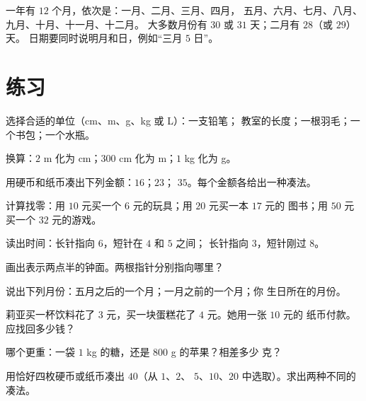 \begin{example}[日历]\label{ex:g2:measure:calendar}
一年有 $12$ 个月，依次是：一月、二月、三月、四月，
五月、六月、七月、八月、九月、十月、十一月、十二月。
大多数月份有 $30$ 或 $31$ 天；二月有 $28$（或 $29$）天。
日期要同时说明月和日，例如“三月 $5$ 日”。
\end{example}

\section{练习}

\begin{exercise}[$\star$]\label{exo:g2:measure:1}
选择合适的单位（cm、m、g、kg 或 L）：一支铅笔；
教室的长度；一根羽毛；一个书包；一个水瓶。
\end{exercise}

\begin{exercise}[$\star$]\label{exo:g2:measure:2}
换算：$2$ m 化为 cm；$300$ cm 化为 m；$1$ kg 化为 g。
\end{exercise}

\begin{exercise}[$\star$]\label{exo:g2:measure:3}
用硬币和纸币凑出下列金额：$16$；\quad $23$；\quad
$35$。每个金额各给出一种凑法。
\end{exercise}

\begin{exercise}[$\star$]\label{exo:g2:measure:4}
计算找零：用 $10$ 元买一个 $6$ 元的玩具；用 $20$ 元买一本 $17$ 元的
图书；用 $50$ 元买一个 $32$ 元的游戏。
\end{exercise}

\begin{exercise}[$\star$]\label{exo:g2:measure:5}
读出时间：长针指向 $6$，短针在 $4$ 和 $5$ 之间；
长针指向 $3$，短针刚过 $8$。
\end{exercise}

\begin{exercise}[$\star$]\label{exo:g2:measure:6}
画出表示两点半的钟面。两根指针分别指向哪里？
\end{exercise}

\begin{exercise}[$\star$]\label{exo:g2:measure:7}
说出下列月份：五月之后的一个月；一月之前的一个月；你
生日所在的月份。
\end{exercise}

\begin{exercise}[$\star$]\label{exo:g2:measure:8}
莉亚买一杯饮料花了 $3$ 元，买一块蛋糕花了 $4$ 元。她用一张 $10$ 元的
纸币付款。应找回多少钱？
\end{exercise}

\begin{exercise}[$\star$]\label{exo:g2:measure:9}
哪个更重：一袋 $1$ kg 的糖，还是 $800$ g 的苹果？相差多少
克？
\end{exercise}

\begin{exercise}[$\star\star$]\label{exo:g2:measure:10}
用恰好四枚硬币或纸币凑出 $40$（从 $1$、$2$、
$5$、$10$、$20$ 中选取）。求出两种不同的凑法。
\end{exercise}
